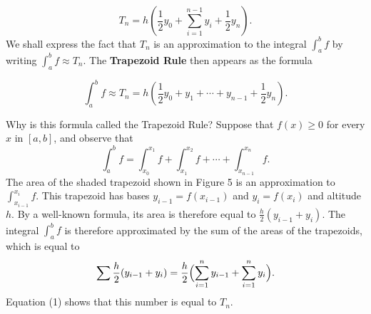 \begin{equation}
T_n = h(\frac{1}{2} y_0 + \sum_{i=1}^{n-1} y_i + \frac{1}{2}y_n) .
\label{eq8.2.2}
\end{equation}
\noindent We shall express the fact that $T_n$ is an approximation to the integral $\int_a^b f$ by writing $\int_a^b f \approx T_n$. The \textbf{Trapezoid Rule} then appears as the formula

\begin{theorem} %
$$\int_a^b f \approx T_n = h (\frac{1}{2}y_0 + y_1 + \cdots + y_{n-1} + \frac{1}{2} y_n) .
$$
\end{theorem}

Why is this formula called the Trapezoid Rule? Suppose that $f(x) \geq 0$ for every $x$ in $[a, b]$, and observe that
$$
\int_a^b f = \int_{x_0}^{x_1} f + \int_{x_1}^{x_2} f + \cdots + \int_{x_{n-1}}^{x_n} f.
$$
\noindent The area of the shaded trapezoid shown in Figure 5 is an approximation to $\int_{x_{i-1}}^{x_i} f$. This trapezoid has bases $y_{i-1} = f(x_{i-1})$ and $y_i = f(x_i)$ and altitude $h$. By a well-known formula, its area is therefore equal to $\frac{h}{2} (y_{i-1} + y_i)$. The integral $\int_a^b f$ is therefore approximated by the sum of the areas of the trapezoids, which is equal to
$$
\sum \frac{h}{2} (y_{i-1} + y_i) = \frac{h}{2} \Bigl( \sum_{i=1}^{n} y_{i -1} + \sum _{i=1}^{n} y_i \Bigr).
$$
\noindent Equation (1) shows that this number is equal to $T_n$.


